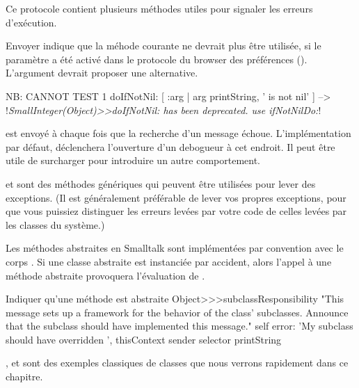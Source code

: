 \documentclass[a4paper,10pt,twoside]{book}
\begin{document}
Ce protocole contient plusieurs méthodes utiles pour signaler les erreurs d'exécution.

Envoyer  indique que la méhode courante ne devrait plus être utilisée, si le paramètre  a été activé dans le protocole  du browser des préférences ().
L'argument  devrait proposer une alternative.

\begin{code}{NB: CANNOT TEST}
1 doIfNotNil: [ :arg | arg printString, ' is not nil' ]
	--> !\emph{SmallInteger(Object)>>doIfNotNil: has been deprecated. use ifNotNilDo:}!
\end{code}

 est envoyé à chaque fois que la recherche d'un message échoue. L'implémentation par défaut, \ie {} déclenchera l'ouverture d'un debogueur à cet endroit. Il peut être utile de surcharger  pour introduire un autre comportement.


 et  sont des méthodes génériques qui peuvent être utilisées pour lever des exceptions.
(Il est généralement préférable de lever vos propres exceptions, pour que vous puissiez distinguer les erreurs levées par votre code de celles levées par les classes du système.)

Les méthodes abstraites en Smalltalk sont implémentées par convention avec le corps . Si une classe abstraite est instanciée par accident, alors l'appel à une méthode abstraite provoquera l'évaluation de .

\begin{method}{Indiquer qu'une méthode est abstraite}
Object>>>subclassResponsibility
    "This message sets up a framework for the behavior of the class' subclasses.
    Announce that the subclass should have implemented this message."
    self error: 'My subclass should have overridden ', thisContext sender selector printString
\end{method}

,  et  sont des exemples classiques de  classes  que nous verrons rapidement dans ce chapitre.
\end{document}
